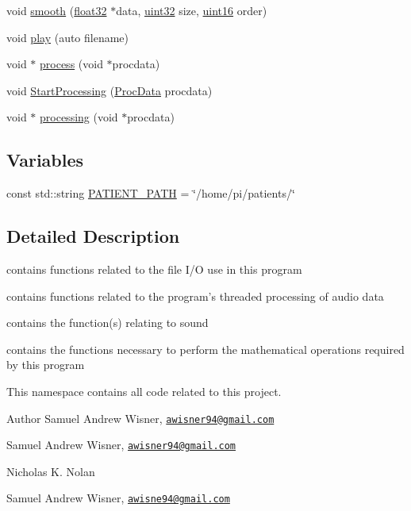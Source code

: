\begin{DoxyCompactItemize}
\item 
void \hyperlink{namespacevaso_a5b7fc1a58199e2cac989f417a9faa1ce}{smooth} (\hyperlink{definitions_8hpp_aacdc525d6f7bddb3ae95d5c311bd06a1}{float32} $\ast$data, \hyperlink{definitions_8hpp_a1134b580f8da4de94ca6b1de4d37975e}{uint32} size, \hyperlink{definitions_8hpp_a05f6b0ae8f6a6e135b0e290c25fe0e4e}{uint16} order)
\item 
void \hyperlink{namespacevaso_a7da499b9b1b5a492bea8ab8681e57c22}{play} (auto filename)
\item 
void $\ast$ \hyperlink{namespacevaso_acd767ffd09e8d7323a0275e8f88a6de2}{process} (void $\ast$procdata)
\item 
void \hyperlink{namespacevaso_aec526a2735f71ef68cea3e00ae943edf}{Start\+Processing} (\hyperlink{structProcData}{Proc\+Data} procdata)
\item 
void $\ast$ \hyperlink{namespacevaso_ae553d67666b43a570bbb1753b2a624d2}{processing} (void $\ast$procdata)
\end{DoxyCompactItemize}
\subsection*{Variables}
\begin{DoxyCompactItemize}
\item 
const std\+::string \hyperlink{namespacevaso_a0f49c8240a13e7d853912ad78d5f53c9}{P\+A\+T\+I\+E\+N\+T\+\_\+\+P\+A\+T\+H} = \char`\"{}/home/pi/patients/\char`\"{}
\end{DoxyCompactItemize}


\subsection{Detailed Description}
contains functions related to the file I/\+O use in this program 

contains functions related to the program's threaded processing of audio data

contains the function(s) relating to sound

contains the functions necessary to perform the mathematical operations required by this program

This namespace contains all code related to this project.

\begin{DoxyAuthor}{Author}
Samuel Andrew Wisner, \href{mailto:awisner94@gmail.com}{\tt awisner94@gmail.\+com}

Samuel Andrew Wisner, \href{mailto:awisner94@gmail.com}{\tt awisner94@gmail.\+com} 

Nicholas K. Nolan

Samuel Andrew Wisner, \href{mailto:awisne94@gmail.com}{\tt awisne94@gmail.\+com} 
\end{DoxyAuthor}


